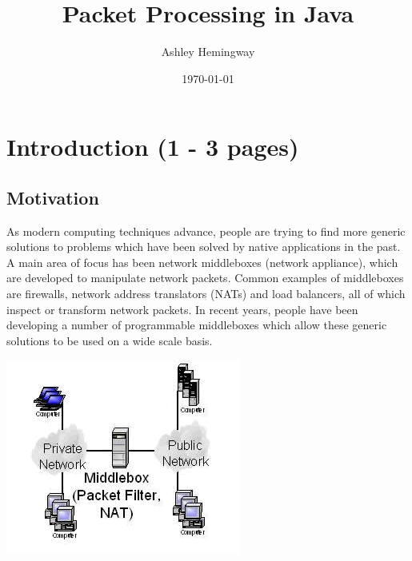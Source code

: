 \documentclass[a4paper, titlepage]{article}
\title{Packet Processing in Java}
\author{Ashley Hemingway}
\date{\monthyeardate\today}
\begin{document}
\maketitle


\listoftodos

\newpage

\tableofcontents

\newpage

\section{Introduction (1 - 3 pages)}
\subsection{Motivation}
As modern computing techniques advance, people are trying to find more generic solutions to problems which have been solved by native applications in the past. A main area of focus has been network middleboxes (network appliance), which are developed to manipulate network packets. Common examples of middleboxes are firewalls, network address translators (NATs) and load balancers, all of which inspect or transform network packets. In recent years, people have been developing a number of programmable middleboxes which allow these generic solutions to be used on a wide scale basis.

\begin{center}
	\includegraphics[scale=0.75]{images/middleboxes.jpg}
\end{center}
\end{document}
